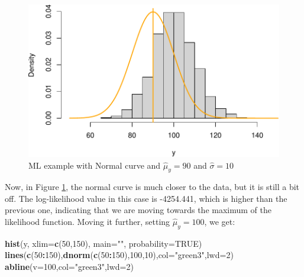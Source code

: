 \documentclass[
]{book}
\newenvironment{Shaded}{\begin{snugshade}}{\end{snugshade}}
\newcommand{\DataTypeTok}[1]{\textcolor[rgb]{0.13,0.29,0.53}{#1}}
\newcommand{\DecValTok}[1]{\textcolor[rgb]{0.00,0.00,0.81}{#1}}
\newcommand{\KeywordTok}[1]{\textcolor[rgb]{0.13,0.29,0.53}{\textbf{#1}}}
\newcommand{\NormalTok}[1]{#1}
\newcommand{\OperatorTok}[1]{\textcolor[rgb]{0.81,0.36,0.00}{\textbf{#1}}}
\newcommand{\OtherTok}[1]{\textcolor[rgb]{0.56,0.35,0.01}{#1}}
\newcommand{\StringTok}[1]{\textcolor[rgb]{0.31,0.60,0.02}{#1}}
\theoremstyle{definition}
\theoremstyle{definition}
\theoremstyle{definition}
\theoremstyle{definition}
\theoremstyle{remark}
\begin{document}
\begin{figure}
\centering
\includegraphics{Svetunkov---Statistics-for-Business-Analytics_files/figure-latex/MLENormalExample02-1.pdf}
\caption{\label{fig:MLENormalExample02}ML example with Normal curve and \(\hat{\mu}_y=90\) and \(\hat{\sigma}=10\)}
\end{figure}

Now, in Figure \ref{fig:MLENormalExample02}, the normal curve is much closer to the data, but it is still a bit off. The log-likelihood value in this case is -4254.441, which is higher than the previous one, indicating that we are moving towards the maximum of the likelihood function. Moving it further, setting \(\hat{\mu}_y=100\), we get:

\begin{Shaded}
\begin{Highlighting}[]
\KeywordTok{hist}\NormalTok{(y, }\DataTypeTok{xlim=}\KeywordTok{c}\NormalTok{(}\DecValTok{50}\NormalTok{,}\DecValTok{150}\NormalTok{), }\DataTypeTok{main=}\StringTok{""}\NormalTok{, }\DataTypeTok{probability=}\OtherTok{TRUE}\NormalTok{)}
\KeywordTok{lines}\NormalTok{(}\KeywordTok{c}\NormalTok{(}\DecValTok{50}\OperatorTok{:}\DecValTok{150}\NormalTok{),}\KeywordTok{dnorm}\NormalTok{(}\KeywordTok{c}\NormalTok{(}\DecValTok{50}\OperatorTok{:}\DecValTok{150}\NormalTok{),}\DecValTok{100}\NormalTok{,}\DecValTok{10}\NormalTok{),}\DataTypeTok{col=}\StringTok{"green3"}\NormalTok{,}\DataTypeTok{lwd=}\DecValTok{2}\NormalTok{)}
\KeywordTok{abline}\NormalTok{(}\DataTypeTok{v=}\DecValTok{100}\NormalTok{,}\DataTypeTok{col=}\StringTok{"green3"}\NormalTok{,}\DataTypeTok{lwd=}\DecValTok{2}\NormalTok{)}
\end{Highlighting}
\end{Shaded}
\end{document}
